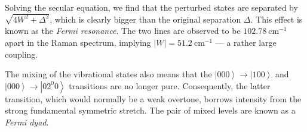 \documentclass{article}
\theoremstyle{plain}\theoremheaderfont{\normalfont\itshape}\theorembodyfont{\rmfamily}\theoremseparator{.}\newtheorem*{rem}{Remark}\newtheorem*{ex}{Example}\newtheorem*{proof}{Proof}\newtheorem*{altp}{Alternative proof}
\theoremstyle{plain}\theoremheaderfont{\normalfont\bfseries}\theorembodyfont{\rmfamily}\theoremseparator{.}\newtheorem{thm}{Theorem}[section]\newtheorem{lem}[thm]{Lemma}\newtheorem{prop}[thm]{Proposition}\newtheorem*{cor}{Corollary}\newtheorem{defn}[thm]{Definition}\newtheorem{clm}[thm]{Claim}\newtheorem{clminproof}{Claim}
\theoremstyle{break}\theoremheaderfont{\normalfont\itshape}\theorembodyfont{\rmfamily}\theoremseparator{.\medskip}\newtheorem*{proofskip}{Proof}\newtheorem*{exs}{Examples}\newtheorem*{rems}{Remarks}
\theoremstyle{break}\theoremheaderfont{\normalfont\bfseries}\theorembodyfont{\rmfamily}\theoremseparator{.\medskip}\newtheorem{lemskip}[thm]{Lemma}\newtheorem{defnskip}[thm]{Definition}\newtheorem{propskip}[thm]{Proposition}\newtheorem{thmskip}[thm]{Theorem}
\numberwithin{equation}{section}
\newcommand{\unit}[1]{\ \mathrm{#1}}
\newcommand{\ket}[1]{\left| #1 \right\rangle}
\newcommand{\abs}[1]{\left| #1 \right|}
\begin{document}
    Solving the secular equation, we find that the perturbed states are separated by \(\sqrt{4W^2+\Delta^2}\), which is clearly bigger than the original separation \(\Delta\). This effect is known as the \textit{Fermi resonance}. The two lines are observed to be \(102.78\unit{cm}^{-1}\) apart in the Raman spectrum, implying \(\abs{W}=51.2\unit{cm}^{-1}\) --- a rather large coupling.

    The mixing of the vibrational states also means that the \(\ket{000}\to\ket{100}\) and \(\ket{000}\to\ket{02^0 0}\) transitions are no longer pure. Consequently, the latter transition, which would normally be a weak overtone, borrows intensity from the strong fundamental symmetric stretch. The pair of mixed levels are known as a \textit{Fermi dyad}.

    \begin{figure}[ht!]
        \centering
    \end{figure}
\end{document}
